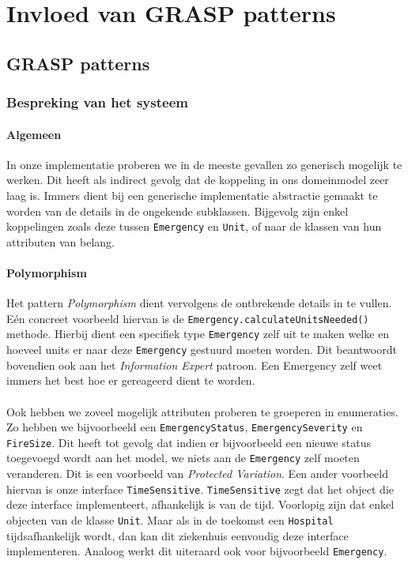 \label{patterns}
\section{Invloed van GRASP patterns}
\subsection{GRASP patterns}
\subsubsection{Bespreking van het systeem}
\paragraph{Algemeen}
In onze implementatie proberen we in de meeste gevallen zo generisch mogelijk te werken. Dit heeft als indirect gevolg dat de koppeling in ons domeinmodel zeer laag is. Immers dient bij een generische implementatie abstractie gemaakt te worden van de details in de ongekende subklassen. Bijgevolg zijn enkel koppelingen zoals deze tussen \texttt{Emergency} en \texttt{Unit}, of naar de klassen van hun attributen van belang.
\paragraph{Polymorphism}
Het pattern \textit{Polymorphism} dient vervolgens de ontbrekende details in te vullen. E\'en concreet voorbeeld hiervan is de \texttt{Emergency.calculateUnitsNeeded()} methode. Hierbij dient een specifiek type \texttt{Emergency} zelf uit te maken welke en hoeveel units er naar deze \texttt{Emergency} gestuurd moeten worden. Dit beantwoordt bovendien ook aan het \textit{Information Expert} patroon. Een Emergency zelf weet immers het best hoe er gereageerd dient te worden.
\paragraph{}
Ook hebben we zoveel mogelijk attributen proberen te groeperen in enumeraties. Zo hebben we bijvoorbeeld een \texttt{EmergencyStatus}, \texttt{EmergencySeverity} en \texttt{FireSize}. Dit heeft tot gevolg dat indien er bijvoorbeeld een nieuwe status toegevoegd wordt aan het model, we niets aan de \texttt{Emergency} zelf moeten veranderen. Dit is een voorbeeld van \textit{Protected Variation}. Een ander voorbeeld hiervan is onze interface \texttt{TimeSensitive}. \texttt{TimeSensitive} zegt dat het object die deze interface implementeert, afhankelijk is van de tijd. Voorlopig zijn dat enkel objecten van de klasse \texttt{Unit}. Maar als in de toekomst een \texttt{Hospital} tijdsafhankelijk wordt, dan kan dit ziekenhuis eenvoudig deze interface implementeren. Analoog werkt dit uiteraard ook voor bijvoorbeeld \texttt{Emergency}.
